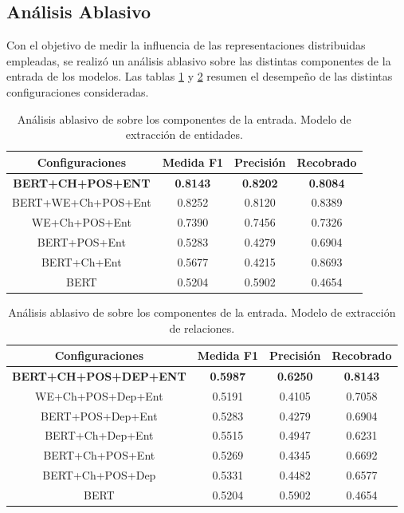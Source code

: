 \subsection{Análisis Ablasivo}

Con el objetivo de medir la influencia de las representaciones distribuidas empleadas, se realizó un análisis ablasivo sobre las distintas componentes de la entrada de los modelos.
Las tablas \ref{table:ablation_entities} y \ref{table:ablation_relations} resumen el desempeño de las distintas configuraciones consideradas.

\begin{table}[tb!]\centering	
	\begin{tabular}{|c|c|c|c|}
		\hline
		\textbf{Configuraciones} &  \textbf{Medida F1} & \textbf{Precisión} & \textbf{Recobrado} \\
		\hline
		\textbf{BERT+CH+POS+ENT} & \textbf{0.8143} & \textbf{0.8202} & \textbf{0.8084} \\
		\hline
		\hline
		BERT+WE+Ch+POS+Ent & 0.8252  & 0.8120 & 0.8389 \\
		WE+Ch+POS+Ent& 0.7390  & 0.7456 & 0.7326 \\
		BERT+POS+Ent & 0.5283 & 0.4279 & 0.6904 \\
		BERT+Ch+Ent & 0.5677 & 0.4215 & 0.8693 \\
		BERT &	0.5204 & 0.5902 & 0.4654 \\
		\hline
	\end{tabular}
	\caption{Análisis ablasivo de sobre los componentes de la entrada. Modelo de extracción de entidades.\label{table:ablation_entities}}
\end{table}

\begin{table}[tb!]\centering
	\begin{tabular}{|c|c|c|c|}
		\hline
		\textbf{Configuraciones} &  \textbf{Medida F1} & \textbf{Precisión} & \textbf{Recobrado} \\
		\hline
		\textbf{BERT+CH+POS+DEP+ENT} & \textbf{0.5987} & \textbf{0.6250} & \textbf{0.8143} \\
		\hline
		\hline
		WE+Ch+POS+Dep+Ent& 0.5191  & 0.4105 & 0.7058 \\
		BERT+POS+Dep+Ent & 0.5283 & 0.4279 & 0.6904 \\
		BERT+Ch+Dep+Ent & 0.5515 & 0.4947 & 0.6231 \\
		BERT+Ch+POS+Ent &	0.5269 & 0.4345 & 0.6692 \\
		BERT+Ch+POS+Dep &	0.5331 & 0.4482 & 0.6577 \\
		BERT &	0.5204 & 0.5902 & 0.4654 \\
		\hline
	\end{tabular}
	\caption{Análisis ablasivo de sobre los componentes de la entrada. Modelo de extracción de relaciones.\label{table:ablation_relations}}
\end{table}

